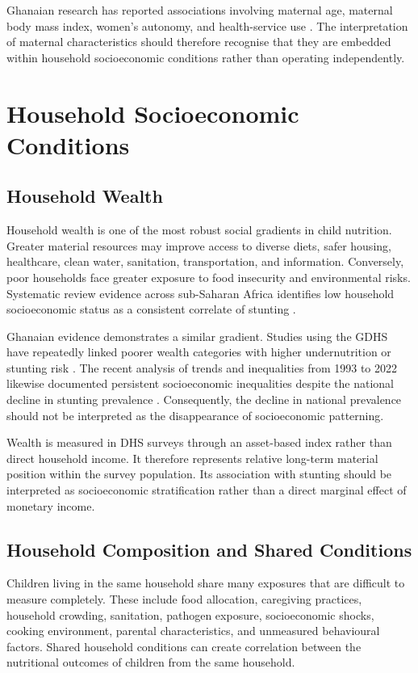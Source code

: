 Ghanaian research has reported associations involving maternal age, maternal body mass index, women's autonomy, and health-service use \cite{BoahEtAl2019}. The interpretation of maternal characteristics should therefore recognise that they are embedded within household socioeconomic conditions rather than operating independently.

\section{Household Socioeconomic Conditions}

\subsection{Household Wealth}

Household wealth is one of the most robust social gradients in child nutrition. Greater material resources may improve access to diverse diets, safer housing, healthcare, clean water, sanitation, transportation, and information. Conversely, poor households face greater exposure to food insecurity and environmental risks. Systematic review evidence across sub-Saharan Africa identifies low household socioeconomic status as a consistent correlate of stunting \cite{AkombiEtAl2017}.

Ghanaian evidence demonstrates a similar gradient. Studies using the GDHS have repeatedly linked poorer wealth categories with higher undernutrition or stunting risk \cite{AhetoEtAl2015,BoahEtAl2019,SeworJayalakshmi2024}. The recent analysis of trends and inequalities from 1993 to 2022 likewise documented persistent socioeconomic inequalities despite the national decline in stunting prevalence \cite{OsborneEtAl2025}. Consequently, the decline in national prevalence should not be interpreted as the disappearance of socioeconomic patterning.

Wealth is measured in DHS surveys through an asset-based index rather than direct household income. It therefore represents relative long-term material position within the survey population. Its association with stunting should be interpreted as socioeconomic stratification rather than a direct marginal effect of monetary income.

\subsection{Household Composition and Shared Conditions}

Children living in the same household share many exposures that are difficult to measure completely. These include food allocation, caregiving practices, household crowding, sanitation, pathogen exposure, socioeconomic shocks, cooking environment, parental characteristics, and unmeasured behavioural factors. Shared household conditions can create correlation between the nutritional outcomes of children from the same household.

